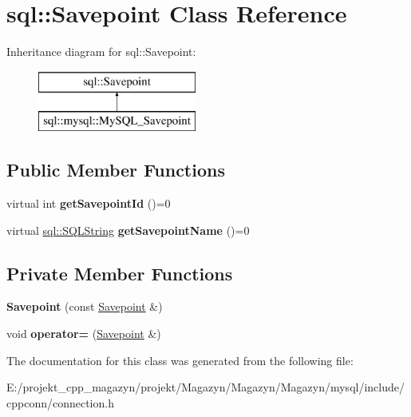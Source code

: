 \hypertarget{classsql_1_1_savepoint}{}\section{sql\+:\+:Savepoint Class Reference}
\label{classsql_1_1_savepoint}
Inheritance diagram for sql\+:\+:Savepoint\+:\begin{figure}[H]
\begin{center}
\leavevmode
\includegraphics[height=2.000000cm]{classsql_1_1_savepoint}
\end{center}
\end{figure}
\subsection*{Public Member Functions}
\begin{DoxyCompactItemize}
\item 
\hypertarget{classsql_1_1_savepoint_a19c0a222303458f74ca16cb05ab50f4a}{}\label{classsql_1_1_savepoint_a19c0a222303458f74ca16cb05ab50f4a} 
virtual int {\bfseries get\+Savepoint\+Id} ()=0
\item 
\hypertarget{classsql_1_1_savepoint_ade620eb2f7c8caccaf5d8fa4f8242be9}{}\label{classsql_1_1_savepoint_ade620eb2f7c8caccaf5d8fa4f8242be9} 
virtual \hyperlink{classsql_1_1_s_q_l_string}{sql\+::\+S\+Q\+L\+String} {\bfseries get\+Savepoint\+Name} ()=0
\end{DoxyCompactItemize}
\subsection*{Private Member Functions}
\begin{DoxyCompactItemize}
\item 
\hypertarget{classsql_1_1_savepoint_abc59bfb9bdcc8e426dc7d7b13ed348da}{}\label{classsql_1_1_savepoint_abc59bfb9bdcc8e426dc7d7b13ed348da} 
{\bfseries Savepoint} (const \hyperlink{classsql_1_1_savepoint}{Savepoint} \&)
\item 
\hypertarget{classsql_1_1_savepoint_a5836938392c757c0430344424757198f}{}\label{classsql_1_1_savepoint_a5836938392c757c0430344424757198f} 
void {\bfseries operator=} (\hyperlink{classsql_1_1_savepoint}{Savepoint} \&)
\end{DoxyCompactItemize}


The documentation for this class was generated from the following file\+:\begin{DoxyCompactItemize}
\item 
E\+:/projekt\+\_\+cpp\+\_\+magazyn/projekt/\+Magazyn/\+Magazyn/\+Magazyn/mysql/include/cppconn/connection.\+h\end{DoxyCompactItemize}
